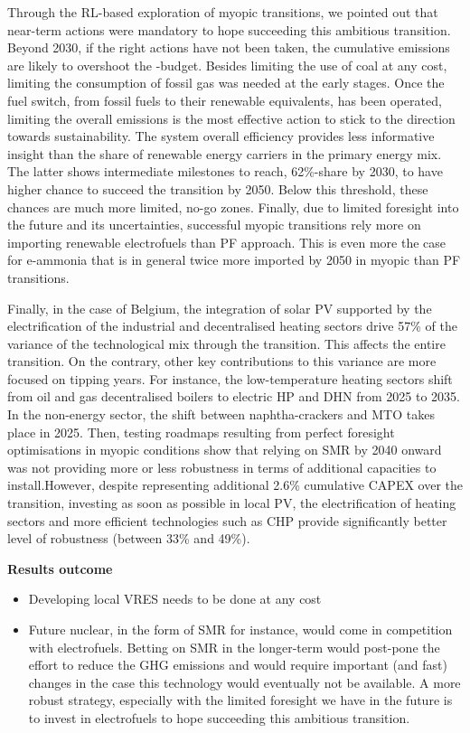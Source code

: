 Through the \gls{RL}-based exploration of myopic transitions, we pointed out that near-term actions were mandatory to hope succeeding this ambitious transition.  Beyond 2030, if the right actions have not been taken, the cumulative emissions are likely to overshoot the -budget. Besides limiting the use of coal at any cost, limiting the consumption of fossil gas was needed at the early stages. Once the fuel switch, from fossil fuels to their renewable equivalents, has been operated, limiting the overall emissions is the most effective action to stick to the direction towards sustainability. The system overall efficiency provides less informative insight than the share of renewable energy carriers in the primary energy mix. The latter shows intermediate milestones to reach, 62\%-share by 2030, to have higher chance to succeed the transition by 2050. Below this threshold, these chances are much more limited, \ie no-go zones. Finally, due to limited foresight into the future and its uncertainties, successful myopic transitions rely more on importing renewable electrofuels than PF approach. This is even more the case for e-ammonia that is in general twice more imported by 2050 in myopic than PF transitions.

Finally, in the case of Belgium, the integration of solar \gls{PV} supported by the electrification of the industrial and decentralised heating sectors drive 57\% of the variance of the technological mix through the transition. This affects the entire transition. On the contrary, other key contributions to this variance are more focused on tipping years. For instance, the low-temperature heating sectors shift from oil and gas decentralised boilers to electric \acrfull{HP} and \acrfull{DHN} from 2025 to 2035. In the non-energy sector, the shift between naphtha-crackers and \acrfull{MTO} takes place in 2025. Then, testing roadmaps resulting from perfect foresight optimisations in myopic conditions show that relying on \gls{SMR} by 2040 onward was not providing more or less robustness in terms of additional capacities to install.However, despite representing additional 2.6\% cumulative CAPEX over the transition, investing as soon as possible in local \gls{PV}, the electrification of heating sectors and more efficient technologies such as \acrfull{CHP} provide significantly better level of robustness (between 33\% and 49\%).


\textbf{Results outcome}
\begin{itemize}
\item Developing local \gls{VRES} needs to be done at any cost
\item Future nuclear, in the form of \gls{SMR} for instance, would come in competition with electrofuels. Betting on \gls{SMR} in the longer-term would post-pone the effort to reduce the \gls{GHG} emissions and would require important (and fast) changes in the case this technology would eventually not be available. A more robust strategy, especially with the limited foresight we have in the future is to invest in electrofuels to hope succeeding this ambitious transition. 
\end{itemize}

